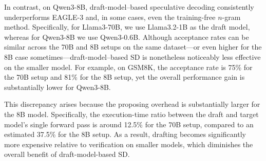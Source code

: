 \documentclass{article}
\newcommand{\jerry}[1]{\textcolor{cyan}{Jerry: #1}}
\begin{document}
In contrast, on Qwen3-8B, draft-model–based speculative decoding consistently underperforms EAGLE-3 and, in some cases, even the training-free $n$-gram method.
Specifically, for Llama3-70B, we use Llama3.2-1B as the draft model, whereas for Qwen3-8B we use Qwen3-0.6B. Although acceptance rates can be similar across the 70B and 8B setups on the same dataset—or even higher for the 8B case sometimes—draft-model–based SD is nonetheless noticeably less effective on the smaller model. For example, on GSM8K, the acceptance rate is 75\% for the 70B setup and 81\% for the 8B setup, yet the overall performance gain is substantially lower for Qwen3-8B.

This discrepancy arises because the proposing overhead is substantially larger for the 8B model. Specifically, the execution-time ratio between the draft and target model's single forward pass is around 12.5\% for the 70B setup, compared to an estimated 37.5\% for the 8B setup. As a result, drafting becomes significantly more expensive relative to verification on smaller models, which diminishes the overall benefit of draft-model-based SD.





\end{document}
